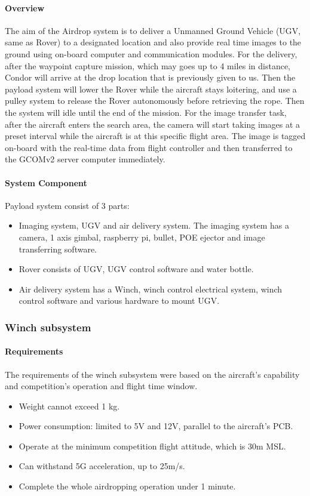 \paragraph{Overview} The aim of the Airdrop system is to deliver a Unmanned Ground Vehicle (UGV, same as Rover) to a designated location and also provide real time images to the ground using on-board computer and communication modules. For the delivery, after the waypoint capture mission, which may goes up to 4 miles in distance, Condor will arrive at the drop location that is previously given to us. Then the payload system will lower the Rover while the aircraft stays loitering, and use a pulley system to release the Rover autonomously before retrieving the rope. Then the system will idle until the end of the mission. For the image transfer task, after the aircraft enters the search area, the camera will start taking images at a preset interval while the aircraft is at this specific flight area. The image is tagged on-board with the real-time data from flight controller and then transferred to the GCOMv2 server computer immediately.  
\paragraph{System Component}
Payload system consist of 3 parts: 
\begin{itemize}
    \item Imaging system, UGV and air delivery system.  The imaging system has a camera, 1 axis gimbal, raspberry pi, bullet, POE ejector and image transferring software. 
    \item Rover consists of UGV, UGV control software and water bottle. 
    \item Air delivery system has a Winch, winch control electrical system, winch control software and various hardware to mount UGV. 
\end{itemize}


\subsubsection{Winch subsystem}
\paragraph{Requirements}
The requirements of the winch subsystem were based on the aircraft's capability and competition's operation and flight time window. 
\begin{itemize}
    \item Weight cannot exceed 1 kg.
    \item Power consumption: limited to 5V and 12V, parallel to the aircraft's PCB.
    \item Operate at the minimum competition flight attitude, which is 30m MSL.
    \item Can withstand 5G acceleration, up to 25m/s.
    \item Complete the whole airdropping operation under 1 minute.
\end{itemize} 

